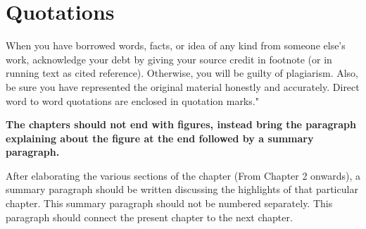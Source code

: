 \section{Quotations}
When you have borrowed words, facts, or idea of any kind from someone else's work, acknowledge your debt by giving your source credit in footnote (or in running text as cited reference). Otherwise, you will be guilty of plagiarism. Also, be sure you have represented the original material honestly and accurately. Direct word to word quotations are enclosed in quotation marks."

\vspace{0.75cm}

 \textbf{The chapters should not end with figures, instead bring the paragraph explaining about the figure at the end followed by a summary paragraph.}

After elaborating the various sections of the chapter (From Chapter 2 onwards), a summary paragraph should be written discussing the highlights of that particular chapter. This summary paragraph should not be numbered separately. This paragraph should connect the present chapter to the next chapter.  